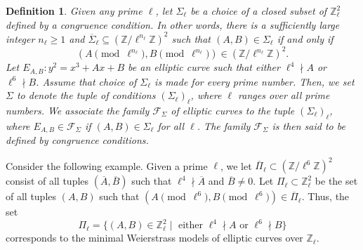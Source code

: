 \documentclass[12pt]{amsart}
\newtheorem{definition}[theorem]{Definition}
\newcommand{\Z}{\mathbb{Z}}
\numberwithin{equation}{section}
\begin{document}
\begin{definition}
    Given any prime $\ell$, let $\Sigma_\ell$ be a choice of a closed subset of $\Z_\ell^2$ defined by a congruence condition. In other words, there is a sufficiently large integer $n_\ell\geq 1$ and $\overline{\Sigma}_\ell\subseteq \left(\Z/\ell^{n_\ell} \Z\right)^2$ such that $(A, B)\in \Sigma_\ell$ if and only if \[\left(A\pmod{\ell^{n_\ell}}, B\pmod{\ell^{n_\ell}}\right)\in \left(\Z/\ell^{n_\ell}\Z\right)^2.\] Let $E_{A,B}:y^2=x^3+Ax+B$ be an elliptic curve such that either $\ell^4 \nmid A$ or $\ell^6 \nmid B$. Assume that choice of $\Sigma_\ell$ is made for every prime number. Then, we set $\Sigma$ to denote the tuple of conditions $(\Sigma_\ell)_{\ell}$, where $\ell$ ranges over all prime numbers. We associate the family $\mathcal{F}_\Sigma$ of elliptic curves to the tuple $(\Sigma_\ell)_\ell$, where $E_{A,B} \in \mathcal{F}_\Sigma$ if $(A,B) \in \Sigma_\ell$ for all $\ell$. The family $\mathcal{F}_\Sigma$ is then said to be defined by congruence conditions.
\end{definition}
Consider the following example. Given a prime $\ell$, we let $\overline{\Pi}_\ell\subset (\Z/\ell^6\Z)^2$ consist of all tuples $(\overline{A}, \overline{B})$ such that $\ell^4\nmid \overline{A}$ and $\overline{B}\neq 0$. Let $\Pi_\ell\subset \Z_\ell^2$ be the set of all tuples $(A,B)$ such that 
$\left(A\pmod{\ell^6}, B\pmod{\ell^6}\right)\in \overline{\Pi}_\ell$.
Thus, the set \[\Pi_\ell=\{(A, B)\in \Z_\ell^2 \mid \text{ either } \ell^4\nmid A \text{ or } \ell^6\nmid B\}\] corresponds to the minimal Weierstrass models of elliptic curves over $\Z_\ell$.
\end{document}
